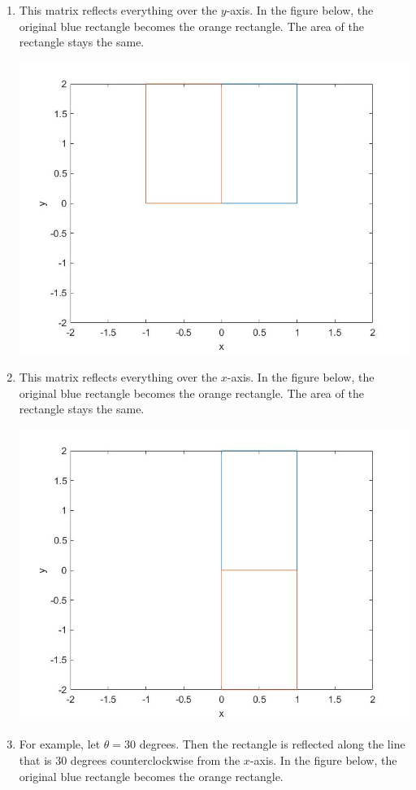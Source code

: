 \begin{sol}
\begin{enumerate}
    \item This matrix reflects everything over the $y$-axis. In the figure below, the original blue rectangle becomes the orange rectangle. The area of the rectangle stays the same.
    \begin{center}
        \includegraphics[width=.75\textwidth]{FacesDay2/figs/yreflect.jpg}
        \label{fig:yreflect}
    \end{center}
        \item This matrix reflects everything over the $x$-axis. In the figure below, the original blue rectangle becomes the orange rectangle. The area of the rectangle stays the same.
    \begin{center}
        \includegraphics[width=.75\textwidth]{FacesDay2/figs/xreflect.jpg}
        \label{fig:xreflect}
    \end{center}
    \item For example, let $\theta=30$ degrees. Then the rectangle is reflected along the line that is 30 degrees counterclockwise from the $x$-axis. In the figure below, the original blue rectangle becomes the orange rectangle.

\end{enumerate}
\end{sol}
